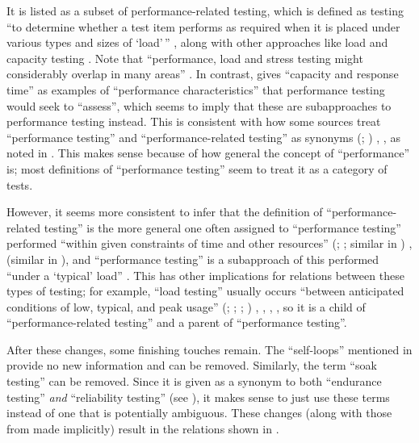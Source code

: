 It is listed as a subset of performance-related testing, which is defined as
testing ``to determine whether a test item performs as required when it is
placed under various types and sizes of `load'\,'' \citeyearpar[p.~38]{IEEE2021},
along with other approaches like load and capacity testing
\citep[p.~22]{IEEE2022}. Note that ``performance, load and stress testing might
considerably overlap in many areas'' \citep[p.~1187]{Moghadam2019}.
In contrast, \citet[p.~5-9]{SWEBOK2024}
gives ``capacity and response time'' as examples of ``performance
characteristics'' that performance testing would seek to ``assess'', which
seems to imply that these are subapproaches to performance testing instead.
This is consistent with how some sources treat ``performance testing'' and
``performance-related testing'' as synonyms \ifnotpaper
    (\citealp[p.~5-9]{SWEBOK2024}; \citealp[p.~1187]{Moghadam2019})%
\else \cite[p.~5-9]{SWEBOK2024}, \cite[p.~1187]{Moghadam2019}%
\fi, as noted in . This makes sense because of how general the
concept of ``performance'' is; most definitions of ``performance testing'' seem
to treat it as a category of tests.

However, it seems more consistent to infer
that the definition of ``performance-related testing'' is the more general one
often assigned to ``performance testing'' performed ``within given constraints
of time and other resources'' \ifnotpaper (\citealp[p.~7]{IEEE2022};
    \citeyear[p.~320]{IEEE2017}; similar in \citealp[p.~1187]{Moghadam2019})%
\else \cite[p.~320]{IEEE2017}, \cite[p.~7]{IEEE2022}
    (similar in \cite[p.~1187]{Moghadam2019})\fi, and
``performance testing'' is a subapproach of this performed ``under a `typical'
load'' \citep[p.~39]{IEEE2021}. This has other implications for relations
between these types of testing; for example, ``load testing'' usually occurs
``between anticipated conditions of low, typical, and peak usage''
\ifnotpaper (\citealp[p.~5]{IEEE2022}; \citeyear[p.~39]{IEEE2021};
    \citeyear[p.~253]{IEEE2017}; \citealpISTQB{})%
\else \cite[p.~253]{IEEE2017}, \cite{ISTQB}, \cite[p.~5]{IEEE2022},
    \cite[p.~39]{IEEE2021}\fi, so it is a child of ``performance-related
testing'' and a parent of ``performance testing''.

After these changes, some finishing touches remain. The ``self-loops''
mentioned in  provide no new information and can be removed.
Similarly, the term ``soak testing'' can be removed. Since it is given as a
synonym to both ``endurance testing'' \emph{and} ``reliability testing'' (see
), it makes sense to just use these terms instead of one that
is potentially ambiguous. These changes (along with those from
 made implicitly) result in
the relations shown in .
